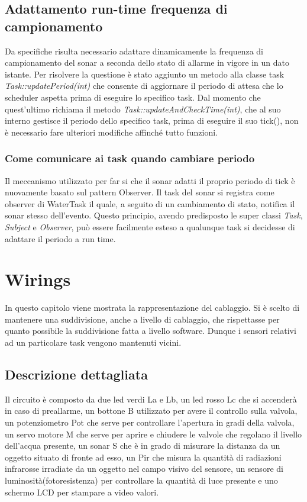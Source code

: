 \documentclass[a4paper,12pt]{report}
\begin{document}
\section{Adattamento run-time frequenza di campionamento}
Da specifiche risulta necessario adattare dinamicamente la frequenza di campionamento del sonar a seconda dello stato di allarme in vigore in un dato istante.
Per risolvere la questione è stato aggiunto un metodo alla classe task \emph{Task::updatePeriod(int)} che consente di aggiornare il periodo di attesa che lo scheduler aspetta prima di eseguire lo specifico task. Dal momento che quest'ultimo richiama il metodo \emph{Task::updateAndCheckTime(int)}, che al suo interno gestisce il periodo dello specifico task, prima di eseguire il suo tick(), non è necessario fare ulteriori modifiche affinché tutto funzioni.
\subsection{Come comunicare ai task quando cambiare periodo}
Il meccanismo utilizzato per far si che il sonar adatti il proprio periodo di tick è nuovamente basato sul pattern Observer. Il task del sonar si registra come observer di WaterTask il quale, a seguito di un cambiamento di stato, notifica il sonar stesso dell'evento. 
Questo principio, avendo predisposto le super classi \emph{Task}, \emph{Subject} e \emph{Observer}, può essere facilmente esteso a qualunque task si decidesse di adattare il periodo a run time.

\chapter{Wirings}
In questo capitolo viene mostrata la rappresentazione del cablaggio. Si è scelto di mantenere una suddivisione, anche a livello di cablaggio, che rispettasse per quanto possibile la suddivisione fatta a livello software. Dunque i sensori relativi ad un particolare task vengono mantenuti vicini.
\section{Descrizione dettagliata}
Il circuito è composto da due led verdi La e Lb, un led rosso Lc che si accenderà in caso di preallarme, un bottone B utilizzato per avere il controllo sulla valvola, un potenziometro Pot che serve per controllare l’apertura in gradi della valvola, un servo motore M che serve per aprire e chiudere le valvole che regolano il livello dell’acqua presente, un sonar S che è in grado di misurare la distanza da un oggetto situato di fronte ad esso, un Pir che misura la quantità di radiazioni infrarosse irradiate da un oggetto nel campo visivo del sensore, un sensore di luminosità(fotoresistenza) per controllare la quantità di luce presente e uno schermo LCD per stampare a video valori. 
\end{document}
